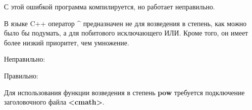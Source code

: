 \begin{typerror}
	\label{TE_xor-as-power}

	С этой ошибкой программа компилируется, но работает неправильно.

	В языке C++ оператор \textbf{\^} предназначен не для возведения в степень, как можно было бы подумать, а для побитового исключающего ИЛИ.
	Кроме того, он имеет более низкий приоритет, чем умножение.

	Неправильно:

	Правильно:

	Для использования функции возведения в степень \textbf{pow} требуется подключение заголовочного файла \textbf{<cmath>}.
\end{typerror}
